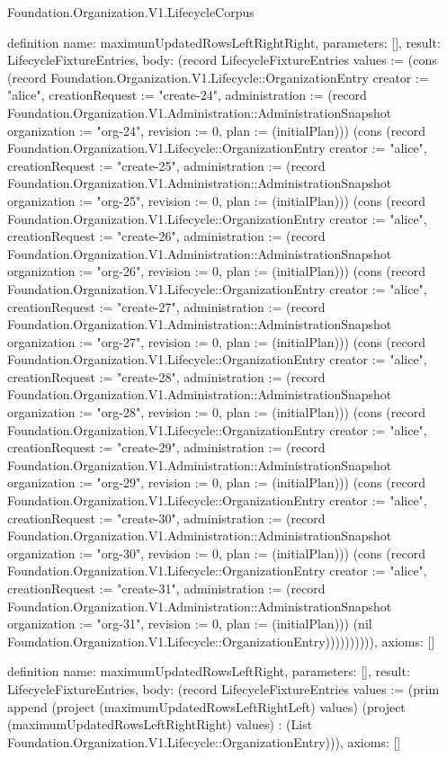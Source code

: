 \begin{lexlean}{Foundation.Organization.V1.LifecycleCorpus}
\begin{semanticmodule}
definition{
  name: maximumUpdatedRowsLeftRightRight,
  parameters: [],
  result: LifecycleFixtureEntries,
  body: (record LifecycleFixtureEntries {values := (cons (record Foundation.Organization.V1.Lifecycle::OrganizationEntry {creator := "alice", creationRequest := "create-24", administration := (record Foundation.Organization.V1.Administration::AdministrationSnapshot {organization := "org-24", revision := 0, plan := (initialPlan)})}) (cons (record Foundation.Organization.V1.Lifecycle::OrganizationEntry {creator := "alice", creationRequest := "create-25", administration := (record Foundation.Organization.V1.Administration::AdministrationSnapshot {organization := "org-25", revision := 0, plan := (initialPlan)})}) (cons (record Foundation.Organization.V1.Lifecycle::OrganizationEntry {creator := "alice", creationRequest := "create-26", administration := (record Foundation.Organization.V1.Administration::AdministrationSnapshot {organization := "org-26", revision := 0, plan := (initialPlan)})}) (cons (record Foundation.Organization.V1.Lifecycle::OrganizationEntry {creator := "alice", creationRequest := "create-27", administration := (record Foundation.Organization.V1.Administration::AdministrationSnapshot {organization := "org-27", revision := 0, plan := (initialPlan)})}) (cons (record Foundation.Organization.V1.Lifecycle::OrganizationEntry {creator := "alice", creationRequest := "create-28", administration := (record Foundation.Organization.V1.Administration::AdministrationSnapshot {organization := "org-28", revision := 0, plan := (initialPlan)})}) (cons (record Foundation.Organization.V1.Lifecycle::OrganizationEntry {creator := "alice", creationRequest := "create-29", administration := (record Foundation.Organization.V1.Administration::AdministrationSnapshot {organization := "org-29", revision := 0, plan := (initialPlan)})}) (cons (record Foundation.Organization.V1.Lifecycle::OrganizationEntry {creator := "alice", creationRequest := "create-30", administration := (record Foundation.Organization.V1.Administration::AdministrationSnapshot {organization := "org-30", revision := 0, plan := (initialPlan)})}) (cons (record Foundation.Organization.V1.Lifecycle::OrganizationEntry {creator := "alice", creationRequest := "create-31", administration := (record Foundation.Organization.V1.Administration::AdministrationSnapshot {organization := "org-31", revision := 0, plan := (initialPlan)})}) (nil Foundation.Organization.V1.Lifecycle::OrganizationEntry)))))))))}),
  axioms: []
}

definition{
  name: maximumUpdatedRowsLeftRight,
  parameters: [],
  result: LifecycleFixtureEntries,
  body: (record LifecycleFixtureEntries {values := (prim append (project (maximumUpdatedRowsLeftRightLeft) values) (project (maximumUpdatedRowsLeftRightRight) values) : (List Foundation.Organization.V1.Lifecycle::OrganizationEntry))}),
  axioms: []
}


\end{semanticmodule}
\end{lexlean}
